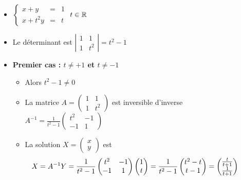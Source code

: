 \begin{frame}
\begin{exemple}

\begin{itemize}
  \item $
\left\{\begin{array}{rcl} 
 x + y  & = & 1\\
 x + t^2 y & = & t 
\end{array}\right.  
$ 
\qquad  $t\in \mathbb{R}$

\pause
  
  \item Le déterminant est 
  $\left| \begin{smallmatrix} 1 & 1 \\ 1 & t^2 \end{smallmatrix}\right|= t^2-1$

\pause  

  \item \textbf{Premier cas : $t\neq+1$ et $t\neq-1$}

  \begin{itemize}
    \item Alors $t^2-1\neq 0$
\pause

    \item La matrice $A=\left( \begin{smallmatrix} 1 & 1 \\ 1 & t^2 \end{smallmatrix}\right)$
est inversible d'inverse $A^{-1} = \frac{1}{t^2-1}\left( \begin{smallmatrix} t^2 & -1 \\ -1 & 1 \end{smallmatrix}\right)$
\pause

    \item La solution $X=\left( \begin{smallmatrix} x \\ y \end{smallmatrix}\right)$ est
$$\hspace*{-2em}X = A^{-1} Y = \frac{1}{t^2-1}\begin{pmatrix} t^2 & -1 \\ -1 & 1 \end{pmatrix} \begin{pmatrix} 1 \\ t \end{pmatrix} 
= \frac{1}{t^2-1}\begin{pmatrix} t^2-t\\ t-1 \end{pmatrix}
= \begin{pmatrix} \frac{t}{t+1} \\ \frac{1}{t+1} \end{pmatrix}$$
\pause


\end{itemize}
\end{itemize}
\end{exemple}
\end{frame}
